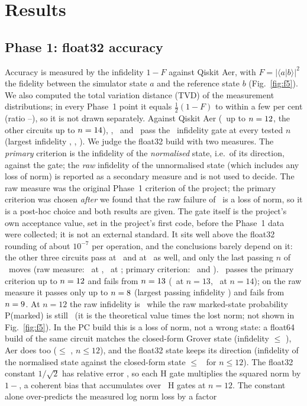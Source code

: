 \section{Results}\label{sec:results}
\subsection{Phase 1: float32 accuracy}
Accuracy is measured by the infidelity $1-F$ against Qiskit Aer, with $F=|\langle a|b\rangle|^2$ the fidelity between the simulator state $a$ and the reference state $b$ (Fig.~\ref{fig:f5}). We also computed the total variation distance (TVD) of the measurement distributions; in every Phase~1 point it equals $\frac12(1-F)$ to within a few per cent (ratio \TvdRatioMin--\TvdRatioMax), so it is not drawn separately. Against Qiskit Aer (\grover\ up to $n=12$, the other circuits up to $n=14$), \hall, \bell\ and \qft\ pass the \PoneGate\ infidelity gate at every tested $n$ (largest infidelity \PoneMaxHall, \PoneMaxBell, \PoneMaxQft). We judge the float32 build with two measures. The \emph{primary} criterion is the infidelity of the \emph{normalised} state, i.e.\ of its direction, against the gate; the \emph{raw} infidelity of the unnormalised state (which includes any loss of norm) is reported as a secondary measure and is not used to decide. The raw measure was the original Phase~1 criterion of the project; the primary criterion was chosen \emph{after} we found that the raw failure of \grover\ is a loss of norm, so it is a post-hoc choice and both results are given. The gate itself is the project's own acceptance value, set in the project's first code, before the Phase~1 data were collected; it is not an external standard. It sits well above the float32 rounding of about $10^{-7}$ per operation, and the conclusions barely depend on it: the other three circuits pass at \PoneThreshLo\ and at \PoneThreshHi\ as well, and only the last passing $n$ of \grover\ moves (raw measure: \PoneGroverLastPassLo\ at \PoneThreshLo, \PoneGroverLastPassHi\ at \PoneThreshHi; primary criterion: \PoneDirLastPassLo\ and \PoneDirLastPassHi). \grover\ passes the primary criterion up to $n=12$ and fails from $n=13$ (\DirThirteen\ at $n=13$, \DirFourteen\ at $n=14$); on the raw measure it passes only up to $n=8$ (largest passing infidelity \PoneGroverMaxPass) and fails from $n=9$. At $n=12$ the raw infidelity is \GroverTwelveRaw\ while the raw marked-state probability P(marked) is still \GroverTwelvePm\ (it is the theoretical value times the lost norm; not shown in Fig.~\ref{fig:f5}). In the PC build this is a loss of norm, not a wrong state: a float64 build of the same circuit matches the closed-form Grover state (infidelity $\le$ \DoubleMax), Aer does too ($\le$ \AerMax, $n\le12$), and the float32 state keeps its direction (infidelity of the normalised state against the closed-form state $\le$ \DirMaxTwelve\ for $n\le12$). The float32 constant $1/\sqrt2$ has relative error \ConstRelErr, so each H gate multiplies the squared norm by $1-$\NormPerH, a coherent bias that accumulates over \GroverTwelveNH\ H gates at $n=12$. The constant alone over-predicts the measured log norm loss by a factor 